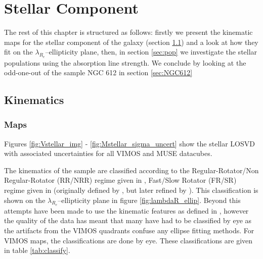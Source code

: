 \chapter{Stellar Component}
	\label{cha:stellar}


The rest of this chapter is structured as follows: firstly we present the kinematic maps for the stellar component of the galaxy (section \ref{sec:stellarKin}) and a look at how they fit on the $\lambda_{R_e}$--ellipticity plane, then, in section \ref{sec:pop} we investigate the stellar populations using the absorption line strength. We conclude by looking at the odd-one-out of the sample NGC 612 in section \ref{sec:NGC612}

\section{Kinematics}
	\label{sec:stellarKin}

	\subsection{Maps}
		\label{subsec:maps}

		

		Figures \ref{fig:Vstellar_img} - \ref{fig:Mstellar_sigma_uncert} show the stellar LOSVD with associated uncertainties for all VIMOS and MUSE datacubes. 

		The kinematics of the sample are classified according to the Regular-Rotator/Non Regular-Rotator (RR/NRR) regime given in \citet{Krajnovic2011}, Fast/Slow Rotator (FR/SR) regime given in \citet{Cappellari2016} (originally defined by \citet{Emsellem2011}, but later refined by \citet{Cappellari2016}). This classification is shown on the $\lambda_{R_e}$--ellipticity plane in figure \ref{fig:lambdaR_ellip}. Beyond this attempts have been made to use the kinematic features as defined in \citet{Krajnovic2011}, however the quality of the data has meant that many have had to be classified by eye as the artifacts from the VIMOS quadrants confuse any ellipse fitting methods. For VIMOS maps, the classifications are done by eye. These classifications are given in table \ref{tab:classify}. 



